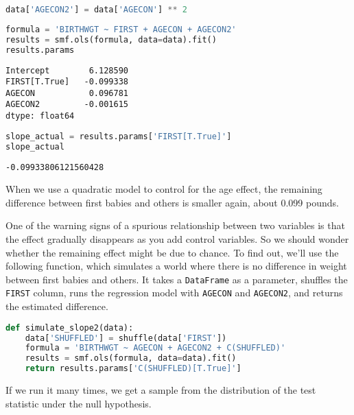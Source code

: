 \begin{lstlisting}[language=Python,style=source]
data['AGECON2'] = data['AGECON'] ** 2
\end{lstlisting}

\begin{lstlisting}[language=Python,style=source]
formula = 'BIRTHWGT ~ FIRST + AGECON + AGECON2'
results = smf.ols(formula, data=data).fit()
results.params
\end{lstlisting}

\begin{lstlisting}[style=output]
Intercept        6.128590
FIRST[T.True]   -0.099338
AGECON           0.096781
AGECON2         -0.001615
dtype: float64
\end{lstlisting}

\begin{lstlisting}[language=Python,style=source]
slope_actual = results.params['FIRST[T.True]']
slope_actual
\end{lstlisting}

\begin{lstlisting}[style=output]
-0.09933806121560428
\end{lstlisting}

When we use a quadratic model to control for the age effect, the
remaining difference between first babies and others is smaller again,
about 0.099 pounds.

One of the warning signs of a spurious relationship between two
variables is that the effect gradually disappears as you add control
variables. So we should wonder whether the remaining effect might be due
to chance. To find out, we'll use the following function, which
simulates a world where there is no difference in weight between first
babies and others. It takes a \passthrough{\lstinline!DataFrame!} as a
parameter, shuffles the \passthrough{\lstinline!FIRST!} column, runs the
regression model with \passthrough{\lstinline!AGECON!} and
\passthrough{\lstinline!AGECON2!}, and returns the estimated difference.

\pagebreak

\begin{lstlisting}[language=Python,style=source]
def simulate_slope2(data):
    data['SHUFFLED'] = shuffle(data['FIRST'])
    formula = 'BIRTHWGT ~ AGECON + AGECON2 + C(SHUFFLED)'
    results = smf.ols(formula, data=data).fit()
    return results.params['C(SHUFFLED)[T.True]']
\end{lstlisting}

If we run it many times, we get a sample from the distribution of the
test statistic under the null hypothesis.

